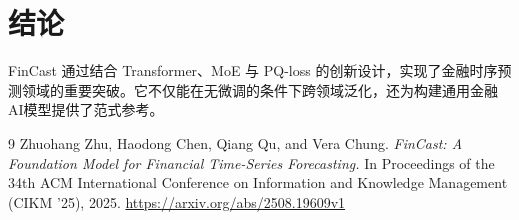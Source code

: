 \documentclass[UTF8]{article}
\begin{document}
\section{结论}
FinCast 通过结合 Transformer、MoE 与 PQ-loss 的创新设计，实现了金融时序预测领域的重要突破。它不仅能在无微调的条件下跨领域泛化，还为构建通用金融AI模型提供了范式参考。

\begin{thebibliography}{9}
Zhuohang Zhu, Haodong Chen, Qiang Qu, and Vera Chung.
\textit{FinCast: A Foundation Model for Financial Time-Series Forecasting.}
In Proceedings of the 34th ACM International Conference on Information and Knowledge Management (CIKM ’25), 2025.
\url{https://arxiv.org/abs/2508.19609v1}

\end{thebibliography}
\end{document}
